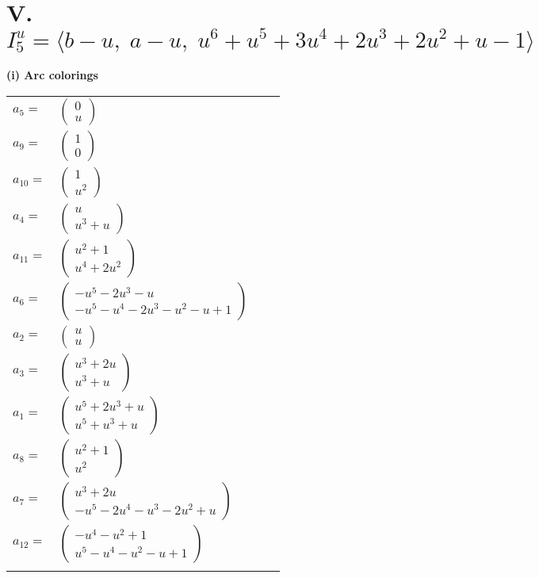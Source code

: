 \documentclass[1p]{elsarticle_modified}
\theoremstyle{definition}
\begin{document}
\centering \section*{V. $I^u_{5}= \langle b- u,\;a- u,\;u^6+u^5+3 u^4+2 u^3+2 u^2+u-1 \rangle$}
\flushleft \textbf{(i) Arc colorings}\\
\begin{tabular}{m{7pt} m{180pt} m{7pt} m{180pt} }
\flushright $a_{5}=$&$\begin{pmatrix}0\\u\end{pmatrix}$ \\
\flushright $a_{9}=$&$\begin{pmatrix}1\\0\end{pmatrix}$ \\
\flushright $a_{10}=$&$\begin{pmatrix}1\\u^2\end{pmatrix}$ \\
\flushright $a_{4}=$&$\begin{pmatrix}u\\u^3+u\end{pmatrix}$ \\
\flushright $a_{11}=$&$\begin{pmatrix}u^2+1\\u^4+2 u^2\end{pmatrix}$ \\
\flushright $a_{6}=$&$\begin{pmatrix}- u^5-2 u^3- u\\- u^5- u^4-2 u^3- u^2- u+1\end{pmatrix}$ \\
\flushright $a_{2}=$&$\begin{pmatrix}u\\u\end{pmatrix}$ \\
\flushright $a_{3}=$&$\begin{pmatrix}u^3+2 u\\u^3+u\end{pmatrix}$ \\
\flushright $a_{1}=$&$\begin{pmatrix}u^5+2 u^3+u\\u^5+u^3+u\end{pmatrix}$ \\
\flushright $a_{8}=$&$\begin{pmatrix}u^2+1\\u^2\end{pmatrix}$ \\
\flushright $a_{7}=$&$\begin{pmatrix}u^3+2 u\\- u^5-2 u^4- u^3-2 u^2+u\end{pmatrix}$ \\
\flushright $a_{12}=$&$\begin{pmatrix}- u^4- u^2+1\\u^5- u^4- u^2- u+1\end{pmatrix}$\\&\end{tabular}
\end{document}
